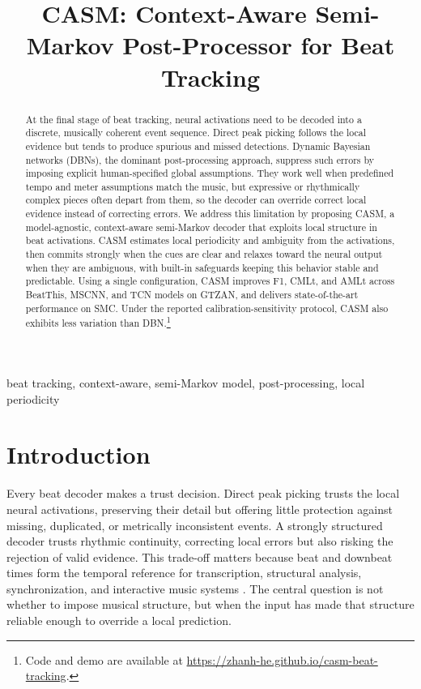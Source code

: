 \documentclass{article}
\title{CASM: Context-Aware Semi-Markov Post-Processor for Beat Tracking}
\begin{document}
\ninept
\maketitle

\begin{abstract}
At the final stage of beat tracking, neural activations need to be decoded into a discrete, musically coherent event sequence. Direct peak picking follows the local evidence but tends to produce spurious and missed detections. Dynamic Bayesian networks (DBNs), the dominant post-processing approach, suppress such errors by imposing explicit human-specified global assumptions. They work well when predefined tempo and meter assumptions match the music, but expressive or rhythmically complex pieces often depart from them, so the decoder can override correct local evidence instead of correcting errors. We address this limitation by proposing CASM, a model-agnostic, context-aware semi-Markov decoder that exploits local structure in beat activations. CASM estimates local periodicity and ambiguity from the activations, then commits strongly when the cues are clear and relaxes toward the neural output when they are ambiguous, with built-in safeguards keeping this behavior stable and predictable. Using a single configuration, CASM improves F1, CMLt, and AMLt across BeatThis, MSCNN, and TCN models on GTZAN, and delivers state-of-the-art performance on SMC. Under the reported calibration-sensitivity protocol, CASM also exhibits less variation than DBN.\footnote{Code and demo are available at \url{https://zhanh-he.github.io/casm-beat-tracking}.}
\end{abstract}

\begin{keywords}
beat tracking, context-aware, semi-Markov model, post-processing, local periodicity
\end{keywords}


\section{Introduction}
\label{sec:intro}
Every beat decoder makes a trust decision. Direct peak picking trusts the local
neural activations, preserving their detail but offering little protection
against missing, duplicated, or metrically inconsistent events. A strongly
structured decoder trusts rhythmic continuity, correcting local errors but also
risking the rejection of valid evidence. This trade-off matters because beat and
downbeat times form the temporal reference for transcription, structural
analysis, synchronization, and interactive music systems
\cite{chiu2023localperiodicity,foscarin2024beat}. The central question is not
whether to impose musical structure, but when the input has made that structure
reliable enough to override a local prediction.
\end{document}
